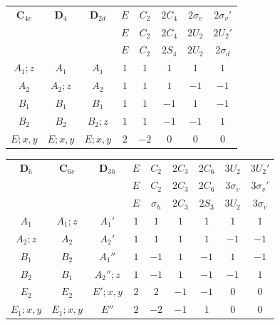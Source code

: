 \begin{center}
\vspace{1.2em}

\begin{tabular}{ccc|ccccc}
  $\boldsymbol{C}_{4v}$ & $\boldsymbol{D}_4$ & $\boldsymbol{D}_{2d}$
  & $E$ & $C_2$ & $2C_4$ & $2\sigma_v$ & $2\sigma_v'$\\
  & & & $E$ & $C_2$ & $2C_4$ & $2U_2$ & $2U_2'$\\
  & & & $E$ & $C_2$ & $2S_4$ & $2U_2$ & $2\sigma_d$\\
  \hline
  $A_1;z$ & $A_1$ & $A_1$ & $1$ & $1$ & $1$ & $1$ & $1$\\
  $A_2$ & $A_2;z$ & $A_2$ & $1$ & $1$ & $1$ & $-1$ & $-1$\\
  $B_1$ & $B_1$ & $B_1$ & $1$ & $1$ & $-1$ & $1$ & $-1$\\
  $B_2$ & $B_2$ & $B_2;z$ & $1$ & $1$ & $-1$ & $-1$ & $1$\\
  $E;x,y$ & $E;x,y$ & $E;x,y$ & $2$ & $-2$ & $0$ & $0$ & $0$\\
\end{tabular}

\vspace{1.2em}

\begin{tabular}{ccc|cccccc}
  $\boldsymbol{D}_6$ & $\boldsymbol{C}_{6v}$ & $\boldsymbol{D}_{3h}$
  & $E$ & $C_2$ & $2C_3$ & $2C_6$ & $3U_2$ & $3U_2'$\\
  & & & $E$ & $C_2$ & $2C_3$ & $2C_6$ & $3\sigma_v$ & $3\sigma_v'$\\
  & & & $E$ & $\sigma_h$ & $2C_3$ & $2S_3$ & $3U_2$ & $3\sigma_v$\\
  \hline
  $A_1$ & $A_1;z$ & $A_1'$ & $1$ & $1$ & $1$ & $1$ & $1$ & $1$\\
  $A_2;z$ & $A_2$ & $A_2'$ & $1$ & $1$ & $1$ & $1$ & $-1$ & $-1$\\
  $B_1$ & $B_2$ & $A_1''$ & $1$ & $-1$ & $1$ & $-1$ & $1$ & $-1$\\
  $B_2$ & $B_1$ & $A_2'';z$ & $1$ & $-1$ & $1$ & $-1$ & $-1$ & $1$\\
  $E_2$ & $E_2$ & $E';x,y$ & $2$ & $2$ & $-1$ & $-1$ & $0$ & $0$\\
  $E_1;x,y$ & $E_1;x,y$ & $E''$ & $2$ & $-2$ & $-1$ & $1$ & $0$ & $0$\\
\end{tabular}

\vspace{1.2em}


\end{center}
